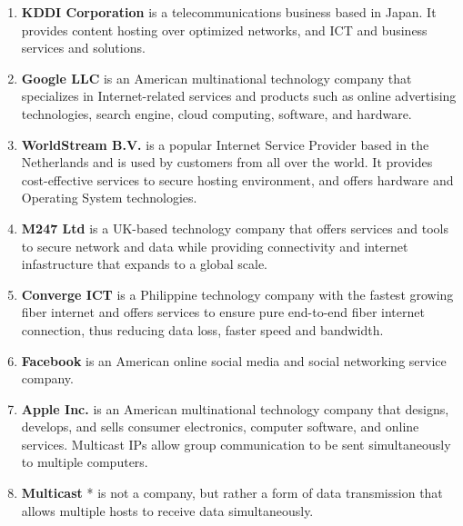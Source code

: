 \documentclass[journal]{IEEE/IEEEtran}
\begin{document}
\begin{enumerate}
\item \textbf{KDDI Corporation} is a telecommunications business based in Japan. It provides content hosting over optimized networks, and ICT and business services and solutions.

\item \textbf{Google LLC} is an American multinational technology company that specializes in Internet-related services and products such as online advertising technologies, search engine, cloud computing, software, and hardware.

\item \textbf{WorldStream B.V.} is a popular Internet Service Provider based in the Netherlands and is used by customers from all over the world. It provides cost-effective services to secure hosting environment, and offers hardware and Operating System technologies.

\item \textbf{M247 Ltd} is a UK-based technology company that offers  services and tools to secure network and data while providing connectivity and internet infastructure that expands to a global scale.

\item \textbf{Converge ICT} is a Philippine technology company with the fastest growing fiber internet and offers services to ensure pure end-to-end fiber internet connection, thus reducing data loss, faster speed and bandwidth.

\item \textbf{Facebook} is an American online social media and social networking service company.

\item \textbf{Apple Inc.} is an American multinational technology company that designs, develops, and sells consumer electronics, computer software, and online services. Multicast IPs allow group communication to be sent simultaneously to multiple computers.

\item \textbf{Multicast} * is not a company, but rather a form of data transmission that allows multiple hosts to receive data simultaneously.

\end{enumerate}

\end{document}
